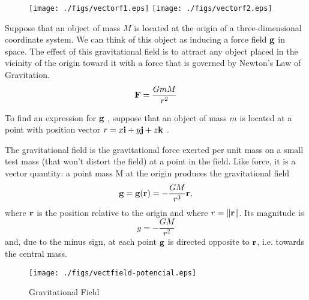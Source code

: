 \begin{figure}[h]
 \centering
 \texttt{[image: ./figs/vectorf1.eps]}
  \texttt{[image: ./figs/vectorf2.eps]}


\end{figure}


\begin{exa}
Suppose that an object  of mass $M$ is located at
the origin of a three-dimensional coordinate system. We can think of this object as
inducing a force field $\mathbf{ g}$ in space. The effect of this gravitational field is to attract any
object placed in the vicinity of the origin toward it with a force that is governed by Newton's Law of Gravitation. 
\[\mathbf{ F}=\dfrac{GmM}{r^2}\]

To find an expression for $\mathbf{ g}$ , suppose that an object of mass $m$ is
located at a point  with position vector $r= x\mathbf{ i} + y\mathbf{ j} + z\mathbf{ k}$ . 

The gravitational field is the gravitational force exerted per unit mass on a small test mass (that won't distort the field) at a point in the field. Like force, it is a vector quantity: a point mass M at the origin produces the gravitational field
\[\mathbf{ g} = \mathbf{ g}(\mathbf{ r}) = -\dfrac{GM}{r^{3} }\mathbf{ r},\]
where $\mathbf{ r}$ is the position relative to the origin and where $r={\left\|\mathbf{ r}\right\|}$. Its magnitude is
\[g=-\dfrac{GM}{r^{2} }\]
and, due to the minus sign, at each point $\mathbf{ g}$ is directed opposite to $\mathbf{ r}$, i.e. towards the central mass.
\end{exa}

\begin{figure}[h]
 \centering
 \texttt{[image: ./figs/vectfield-potencial.eps]}
 \caption{Gravitational Field}
 \label{fig:gravfield}
\end{figure}




